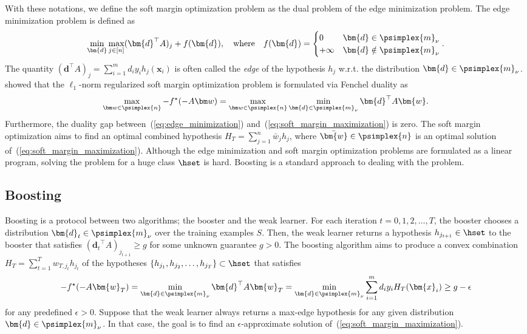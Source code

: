 With these notations, 
we define the soft margin optimization problem 
as the dual problem of the edge minimization problem. 
The edge minimization problem is defined as 
\begin{align}
    \label{eq:edge_minimization}
    \min_{\bm{d}}
        \max_{j \in [n]} (\bm{d}^\top A)_j
        + f(\bm{d}),
    \quad
    \text{where}
    \quad
    f(\bm{d}) = 
    \begin{cases}
        0 & \bm{d} \in \psimplex{m}_{\nu} \\
        +\infty & \bm{d} \notin \psimplex{m}_{\nu}
    \end{cases}.
\end{align}
The quantity $(\bm{d}^\top A)_j = \sum_{i=1}^m d_i y_i h_j(\bm{x}_i)$ is 
often called the \emph{edge} of the hypothesis $h_j$ 
w.r.t. the distribution $\bm{d} \in \psimplex{m}_{\nu}$. 
\cite{shalev-shwartz+:jml10} showed that 
the $\ell_1$-norm regularized soft margin optimization problem is 
formulated via Fenchel duality as 
\begin{align}
    \label{eq:soft_margin_maximization}
    \max_{\bm w \in \psimplex{n}} - f^\star(- A\bm w)
    = \max_{\bm w \in \psimplex{n}} \min_{\bm{d} \in \psimplex{m}_{\nu}}
    \bm{d}^\top A \bm{w}.
\end{align}
Furthermore, the duality gap between~(\ref{eq:edge_minimization}) 
and~(\ref{eq:soft_margin_maximization}) is zero. 
The soft margin optimization aims 
to find an optimal combined hypothesis 
$H_{T} = \sum_{j=1}^n \bar{w}_j h_j$, 
where $\bar{\bm{w}} \in \psimplex{n}$ is 
an optimal solution of~(\ref{eq:soft_margin_maximization}). 
Although the edge minimization and soft margin optimization problems are 
formulated as a linear program, 
solving the problem for a huge class $\hset$ is hard. 
Boosting is a standard approach to dealing with the problem. 


\subsection{Boosting}
Boosting is a protocol between two algorithms; 
the booster and the weak learner. 
For each iteration $t = 0, 1, 2, \dots, T$, 
the booster chooses a distribution $\bm{d}_t \in \psimplex{m}_{\nu}$ 
over the training examples $S$. 
Then, the weak learner returns a hypothesis $h_{j_{t+1}} \in \hset$ 
to the booster that satisfies $({\bm{d}_t}^\top A)_{j_{t+1}} \geq g$ 
for some unknown guarantee $g > 0$. 
The boosting algorithm aims to produce a convex combination 
$H_T = \sum_{t=1}^T w_{T,j_t} h_{j_t}$ 
of the hypotheses $\{h_{j_1}, h_{j_2}, \dots, h_{j_T}\} \subset \hset$ 
that satisfies 
\begin{align}
    \label{eq:boosting_goal}
    -f^\star ( - A \bm{w}_T )
    = \min_{\bm{d} \in \psimplex{m}_{\nu}} 
    \bm{d}^\top A \bm{w}_T
    = \min_{\bm{d} \in \psimplex{m}_{\nu}} 
    \sum_{i=1}^m d_i y_i H_T(\bm{x}_i)
    \geq g - \epsilon
\end{align}
for any predefined $\epsilon > 0$. 
Suppose that the weak learner always returns a max-edge hypothesis 
for any given distribution $\bm{d} \in \psimplex{m}_{\nu}$. 
In that case, 
the goal is to find an $\epsilon$-approximate solution 
of~(\ref{eq:soft_margin_maximization}). 

